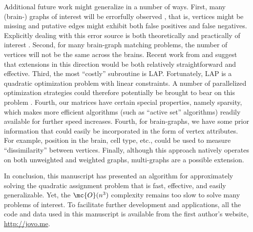 \documentclass[10pt,journal,cspaper,compsoc]{IEEEtran}
\begin{document}
Additional future work might generalize \FAQ in a number of ways.  First, many (brain-) graphs of interest will be errorfully observed \cite{Priebe2011}, that is, vertices might be missing and putative edges might exhibit both false positives and false negatives.  Explicitly dealing with this error source is both theoretically and practically of interest \cite{VP11_unlabeled}.  
Second, for many brain-graph matching problems, the number of vertices will not be the same across the brains.  Recent work from \cite{Zaslavskiy2009, Zaslavskiy2010} and \cite{Escolano2011} suggest that extensions in this direction would be both relatively straightforward and effective. Third, the most ``costly'' subroutine is LAP.  Fortunately, LAP is a quadratic optimization problem with linear constraints.  A number of parallelized optimization strategies could therefore potentially be brought to bear on this problem \cite{Boyd2011}.  Fourth, our matrices have certain special properties, namely sparsity, which makes more efficient algorithms (such as ``active set'' algorithms) readily available for further speed increases.  Fourth, for brain-graphs, we have some prior information that could easily be incorporated in the form of vertex attributes.  For example, position in the brain, cell type, etc., could be used to measure ``dissimilarity'' between vertices.  %
Finally, although this approach natively operates on both unweighted and weighted graphs, multi-graphs are a possible extension.

In conclusion, this manuscript has presented an algorithm for approximately solving the quadratic assignment problem that is fast, effective, and easily generalizable.  Yet, the $\mc{O}(n^3)$ complexity remains too slow to solve many problems of interest.  To facilitate further development and applications, all the code and data used in this manuscript is available from the first author's website, \url{http://jovo.me}.
\end{document}

